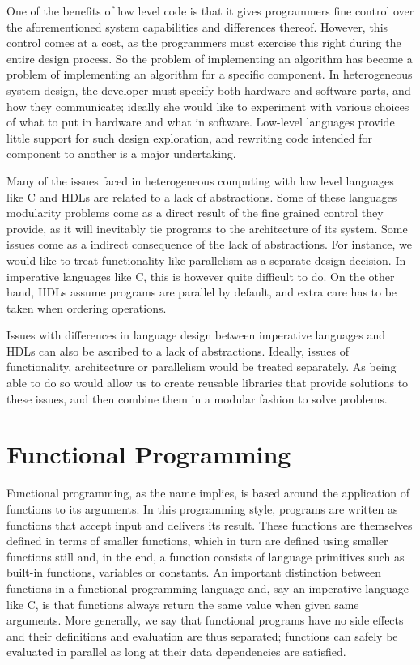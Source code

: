 \documentclass[../main.tex]{subfiles}
\begin{document}
One of the benefits of low level code is that it gives programmers fine control over the aforementioned system capabilities and differences thereof. However, this control comes at a cost, as the programmers must exercise this right during the entire design process. So the problem of implementing an algorithm has become a problem of implementing an algorithm for a specific component. In heterogeneous system design, the developer must specify both hardware and software parts, and how they communicate; ideally she would like to experiment with various choices of what to put in hardware and what in software. Low-level languages provide little support for such design exploration, and rewriting code intended for component to another is a major undertaking.


Many of the issues faced in heterogeneous computing with low level languages like C and HDLs are related to a lack of abstractions. Some of these languages modularity problems come as a direct result of the fine grained control they provide, as it will inevitably tie programs to the architecture of its system. Some issues come as a indirect consequence of the lack of abstractions. For instance, we would like to treat functionality like parallelism as a separate design decision. In imperative languages like C, this is however quite difficult to do. On the other hand, HDLs assume programs are parallel by default, and extra care has to be taken when ordering operations.

Issues with differences in language design between imperative languages and HDLs can also be ascribed to a lack of abstractions. Ideally, issues of functionality, architecture or parallelism would be treated separately. As being able to do so would allow us to create reusable libraries that provide solutions to these issues, and then combine them in a modular fashion to solve problems.

\section{Functional Programming}
\label{functional}

Functional programming, as the name implies, is based around the application of functions to its arguments. In this programming style, programs are written as functions that accept input and delivers its result. These functions are themselves defined in terms of smaller functions, which in turn are defined using smaller functions still and, in the end, a function consists of language primitives such as built-in functions, variables or constants. An important distinction between functions in a functional programming language and, say an imperative language like C, is that functions always return the same value when given same arguments. More generally, we say that functional programs have no side effects and their definitions and evaluation are thus separated; functions can safely be evaluated in parallel as long at their data dependencies are satisfied.
\end{document}
